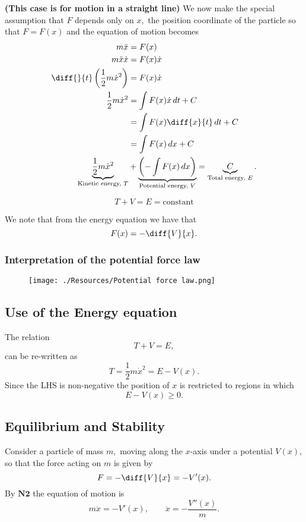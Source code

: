 \documentclass[12pt, a4paper]{article}
\newcommand{\f}[2]{\frac{#1}{#2}}
\theoremstyle{definition}
\theoremstyle{plain}
\begin{document}
\textbf{(This case is for motion in a straight line)} We now make the special assumption that $F$ depends only on $x,$ the position coordinate of the particle so that $F = F (x)$ and the equation of motion becomes $$\begin{aligned}
m\ddot{x}&=F(x)\\
m\ddot{x}\dot{x}&=F(x)\dot{x} \\
\diff{}{t}\left(\f{1}{2}m\dot{x}^2\right)&=F(x)\dot{x}\\
\f{1}{2}m\dot{x}^2&=\int F(x)\dot{x} \, dt +C \\
				&= \int F(x)\diff{x}{t}\, dt +C \\
				&= \int F(x)\, dx +C \\
\underbrace{\f{1}{2}m\dot{x}^2}_{\text{Kinetic energy, } T}&+\underbrace{\left(-\int F(x)\, dx\right)}_{\text{Potential energy, } V} =\underbrace{C}_{\text{Total energy, } E}. \\
\end{aligned}$$
\begin{tcolorbox}
$$T+V=E=\text{constant}$$
\end{tcolorbox}

We note that from the energy equation we have that $$F(x)=-\diff{V}{x}.$$

\subsubsection*{Interpretation of the potential force law}

\begin{figure}[H]
\centering
\texttt{[image: ./Resources/Potential force law.png]}
\end{figure}

\subsection{Use of the Energy equation}

The relation $$T+V=E,$$ can be re-written as $$T=\f{1}{2}m\dot{x}^2=E-V(x).$$ Since the LHS is non-negative the position of $x$ is restricted to regions in which $$E-V(x)\geq 0.$$

\subsection{Equilibrium and Stability}

Consider a particle of mass $m,$ moving along the $x$-axis under a potential $V(x),$ so that the force acting on $m$ is given by $$F=-\diff{V}{x}=-V'(x).$$ By $\bm{N2}$ the equation of motion is $$m\ddot{x}=-V'(x), \qquad \ddot{x} = -\f{V''(x)}{m}.$$
\end{document}
